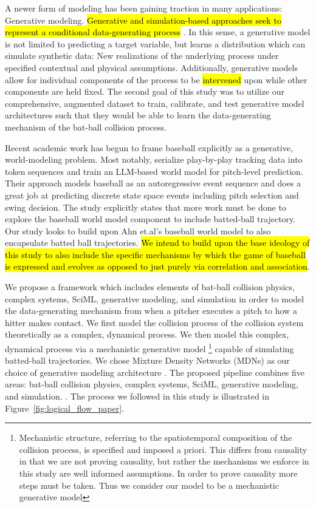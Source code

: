 \documentclass[11pt]{article}
\begin{document}
A newer form of modeling has been gaining traction in many applications: Generative modeling. \hl{Generative and simulation-based approaches seek to represent a conditional data-generating process} \citep{cranmer2020frontier,deistler2025simulation}. In this sense, a generative model is not limited to predicting a target variable, but learns a distribution which can simulate synthetic data: New realizations of the underlying process under specified contextual and physical assumptions. Additionally, generative models allow for individual components of the process to be \hl{intervened} upon while other components are held fixed. The second goal of this study was to utilize our comprehensive, augmented dataset to train, calibrate, and test generative model architectures such that they would be able to learn the data-generating mechanism of the bat-ball collision process.

Recent academic work has begun to frame baseball explicitly as a generative, world-modeling problem. Most notably, \citet{ahn2026neural} serialize play-by-play tracking data into token sequences and train an LLM-based world model for pitch-level prediction. Their approach models baseball as an autoregressive event sequence and does a great job at predicting discrete state space events including pitch selection and swing decision. The study explicitly states that more work must be done to explore the baseball world model component to include batted-ball trajectory. Our study looks to build upon Ahn et.al's baseball world model to also encapsulate batted ball trajectories. \hl{We intend to build upon the base ideology of this study to also include the specific mechanisms by which the game of baseball is expressed and evolves as opposed to just purely via correlation and association}.

We propose a framework which includes elements of  bat-ball collision physics, complex systems, SciML, generative modeling, and simulation in order to model the data-generating mechanism from when a pitcher executes a pitch to how a hitter makes contact. We first model the collision process of the collision system theoretically as a complex, dynamical process. We then model this complex, dynamical process via a mechanistic generative model \footnote{Mechanistic structure, referring to the spatiotemporal composition of the collision process, is specified and imposed a priori. This differs from causality in that we are not proving causality, but rather the mechanisms we enforce in this study are well informed assumptions. In order to prove causality more steps must be taken. Thus we consider our model to be a mechanistic generative model} capable of simulating batted-ball trajectories. We chose Mixture Density Networks (MDNs) as our choice of generative modeling architecture \citep{bishop1994mixture}. The proposed pipeline combines five areas: bat-ball collision physics, complex systems, SciML, generative modeling, and simulation. \citep{nathan2000dynamics, cross2006scattering, kensrud2017oblique, karniadakis2021physics, deistler2025simulation}. The process we followed in this study is illustrated in Figure~\ref{fig:logical_flow_paper}.
\end{document}
